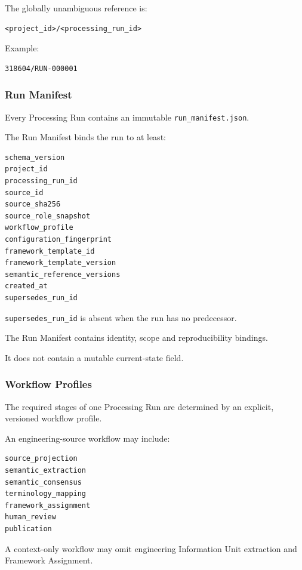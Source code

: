 The globally unambiguous reference is:

\begin{verbatim}
<project_id>/<processing_run_id>
\end{verbatim}

Example:

\begin{verbatim}
318604/RUN-000001
\end{verbatim}

\hypertarget{run-manifest}{%
\subsubsection{Run Manifest}\label{run-manifest}}

Every Processing Run contains an immutable \texttt{run\_manifest.json}.

The Run Manifest binds the run to at least:

\begin{verbatim}
schema_version
project_id
processing_run_id
source_id
source_sha256
source_role_snapshot
workflow_profile
configuration_fingerprint
framework_template_id
framework_template_version
semantic_reference_versions
created_at
supersedes_run_id
\end{verbatim}

\texttt{supersedes\_run\_id} is absent when the run has no predecessor.

The Run Manifest contains identity, scope and reproducibility bindings.

It does not contain a mutable current-state field.

\hypertarget{workflow-profiles}{%
\subsubsection{Workflow Profiles}\label{workflow-profiles}}

The required stages of one Processing Run are determined by an explicit, versioned workflow profile.

An engineering-source workflow may include:

\begin{verbatim}
source_projection
semantic_extraction
semantic_consensus
terminology_mapping
framework_assignment
human_review
publication
\end{verbatim}

A context-only workflow may omit engineering Information Unit extraction and Framework Assignment.

